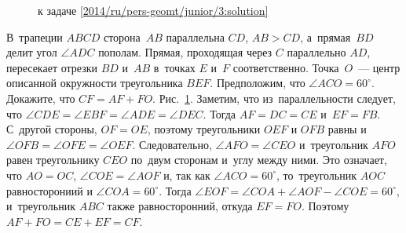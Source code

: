 \ifsolution
\begin{figure}\centering
    \caption{к задаче \ref{2014/ru/pers-geomt/junior/3:solution}}
    \label{2014/ru/pers-geomt/junior/3:solution:fig}
\end{figure}%
\fi %

\problem
В~трапеции $ABCD$ сторона~$AB$ параллельна $CD$, $AB > CD$, а~прямая~$BD$
делит угол $\angle ADC$ пополам.
Прямая, проходящая через $C$ параллельно $AD$, пересекает отрезки $BD$ и~$AB$
в~точках $E$ и~$F$ соответственно.
Точка~$O$~--- центр описанной окружности треугольника $BEF$.
Предположим, что $\angle ACO = 60^{\circ}$.
Докажите, что $CF = AF + FO$.
\solution
\label{2014/ru/pers-geomt/junior/3:solution}%
Рис.~\ref{2014/ru/pers-geomt/junior/3:solution:fig}.
Заметим, что из~параллельности следует, что
$\angle CDE = \angle EBF = \angle ADE = \angle DEC$.
Тогда $AF = DC = CE$ и~$EF = FB$.
С~другой стороны, $OF = OE$, поэтому треугольники $OEF$ и $OFB$ равны
и~$\angle OFB = \angle OFE = \angle OEF$.
Следовательно, $\angle AFO = \angle CEO$ и~треугольник $AFO$ равен
треугольнику $CEO$ по~двум сторонам и~углу между ними.
Это означает, что $AO = OC$, $\angle COE = \angle AOF$ и, так как
$\angle ACO = 60^\circ$, то~треугольник $AOC$ равносторониий и
$\angle COA = 60^\circ$.
Тогда $\angle EOF = \angle COA + \angle AOF - \angle COE = 60^\circ$,
и~треугольник $ABC$ также равносторонний, откуда $EF = FO$.
Поэтому $AF + FO = CE + EF = CF$.
\endproblem
